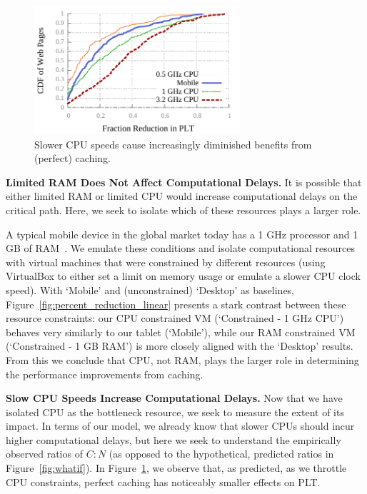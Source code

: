 \begin{figure}[t]
    \includegraphics[width=3in]{../graphs/percent_plt_reduction/percent_reduction_linear_CPU_comparison.pdf}
    \caption[]{\label{fig:plt_cpu_comparison}Slower CPU speeds cause increasingly diminished benefits from (perfect) caching.}
\end{figure}
{\bf Limited RAM Does Not Affect Computational Delays.}
It is possible that either limited RAM or limited CPU would increase computational delays on the critical path.
Here, we seek to isolate which of these resources plays a larger role.

A typical mobile device in the global market today has a 1 GHz processor and 1 GB of RAM~\cite{mobile-stats}. We emulate these conditions and isolate computational resources with virtual machines that were constrained by different resources (using VirtualBox to either set a limit on memory usage or emulate a slower CPU clock speed).
With `Mobile' and (unconstrained) `Desktop' as baselines, Figure~\ref{fig:percent_reduction_linear} presents a stark contrast between these resource constraints:
our CPU constrained VM (`Constrained - 1 GHz CPU') behaves very
similarly to our tablet (`Mobile'), while our RAM constrained VM (`Constrained - 1 GB RAM') is more closely aligned with the `Desktop' results.
From this we conclude that CPU, not RAM, plays the larger role in determining the performance improvements from caching.


{\bf Slow CPU Speeds Increase Computational Delays.}
Now that we have isolated CPU as the bottleneck resource, we seek to measure
the extent of its impact. In terms of our model, we already know that slower
CPUs should incur higher computational delays, but here we seek to understand
the empirically observed ratios of $C:N$ (as opposed to the hypothetical,
predicted ratios in Figure~\ref{fig:whatif}).
In Figure~\ref{fig:plt_cpu_comparison}, we observe that, as predicted,
as we throttle CPU constraints, perfect caching has noticeably smaller effects on PLT. %

